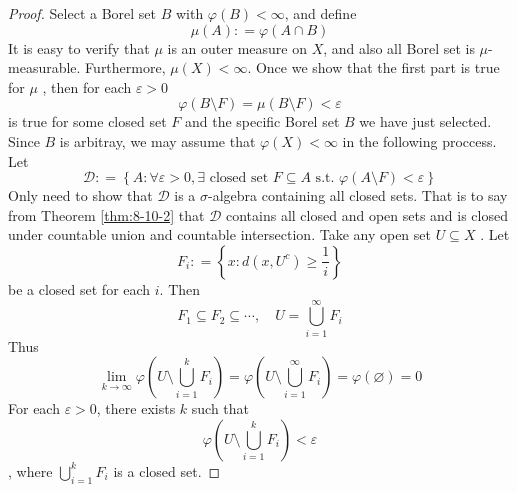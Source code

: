 \documentclass[../main.tex]{subfiles}
\begin{document}
\begin{proof}

   Select a Borel set \(  B  \) with \(   \varphi \left( B \right)< \infty   \), and define \[
   \mu \left( A \right): =   \varphi \left( A\cap B \right)  
   \]It is easy to verify that \(  \mu   \) is an outer measure on \(  X  \), and also all Borel    set is \(  \mu   \)-measurable. Furthermore, \(  \mu \left( X \right)< \infty   \).   Once we show that the first part is true for \(  \mu   \) , then for each \(   \varepsilon > 0  \)  \[
    \varphi \left( B\setminus F \right)=\mu \left( B\setminus F \right)<  \varepsilon  
   \] is true for some closed set \(  F  \) and the specific Borel set \(  B  \) we have just selected. Since \(  B  \) is arbitray,  we may assume that \(   \varphi \left( X \right)< \infty   \) in the following proccess. 
    Let \[
    \mathcal{D}: = \left\{ A:   \forall  \varepsilon > 0, \exists \text{ closed set } F\subseteq A \text{ s.t. } \varphi \left( A\setminus F \right)<  \varepsilon   \right\}
    \]  Only need to show that \(  \mathcal{D}  \) is a \(   \sigma   \)-algebra  containing all closed sets. That is to say from Theorem \ref{thm:8-10-2} that \(  \mathcal{D}  \) contains all closed and open sets and is closed under countable union and countable intersection. Take any open set \(  U\subseteq X  \)  . Let \[
    F_{i}: = \left\{ x: d\left( x,U^{c}\right)\ge \frac{1 }{i }   \right\}
    \]  be a closed set for each \(  i  \). Then \[
    F_1\subseteq F_2\subseteq \cdots ,\quad  U = \bigcup _{i= 1}^{\infty}F_{i} 
    \] Thus \[
   \lim_{k\to \infty}  \varphi \left( U\setminus \bigcup _{i= 1}^{k}F_{i} \right) =  \varphi \left( U\setminus \bigcup _{i= 1}^{\infty}F_{i} \right)=  \varphi \left( \varnothing \right)= 0  
    \] For each \(   \varepsilon > 0  \), there exists \(  k  \) such that \[
     \varphi \left( U\setminus \bigcup _{i= 1}^{k}F_{i} \right)<  \varepsilon 
    \], where  \(  \bigcup _{i= 1}^{k}F_{i}  \) is a closed set.  
    

\end{proof}
\end{document}
